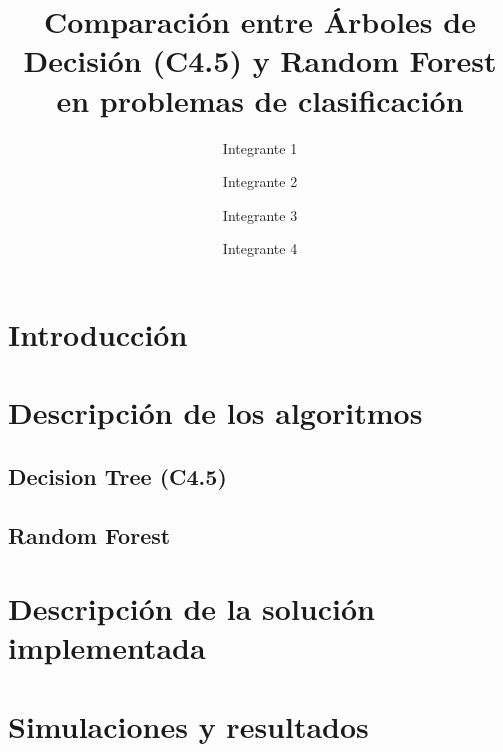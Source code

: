\documentclass{llncs}
\begin{document}
\title{Comparaci\'on entre \'Arboles de Decisi\'on (C4.5) y Random Forest\\en problemas de clasificaci\'on}

\author{Integrante 1 \and Integrante 2 \and Integrante 3 \and Integrante 4}

\maketitle

\begin{abstract}
\end{abstract}

\section{Introducci\'on}

\section{Descripci\'on de los algoritmos}
\subsection{Decision Tree (C4.5)}
\subsection{Random Forest}

\section{Descripci\'on de la soluci\'on implementada}

\section{Simulaciones y resultados}
\end{document}
